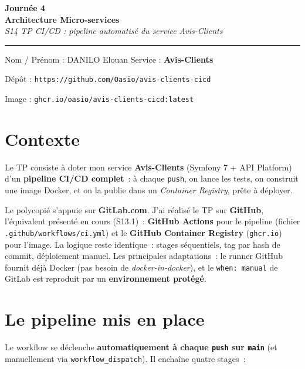 \documentclass[11pt,a4paper]{article}
\begin{document}
\thispagestyle{empty}
\begin{center}
  {\LARGE\bfseries Journée 4}\\[4pt]
  {\large\bfseries Architecture Micro-services}\\[6pt]
  {\normalsize\itshape S14 \textperiodcentered{} TP CI/CD : pipeline automatisé du service Avis-Clients}\\[6pt]
\end{center}

\vspace{4pt}\hrule\vspace{8pt}

Nom / Prénom : DANILO Elouan \hfill Service : \textbf{Avis-Clients}

\vspace{4pt}

Dépôt : \texttt{https://github.com/Oasio/avis-clients-cicd}

Image : \texttt{ghcr.io/oasio/avis-clients-cicd:latest}

\vspace{6pt}

\section{Contexte}

Le TP consiste à doter mon service \textbf{Avis-Clients} (Symfony 7 + API Platform) d'un
\textbf{pipeline CI/CD complet}~: à chaque \texttt{push}, on lance les tests, on construit une
image Docker, et on la publie dans un \emph{Container Registry}, prête à déployer.

Le polycopié s'appuie sur \textbf{GitLab.com}. J'ai réalisé le TP sur \textbf{GitHub}, l'équivalent
présenté en cours (S13.1)~: \textbf{GitHub Actions} pour le pipeline (fichier
\texttt{.github/workflows/ci.yml}) et le \textbf{GitHub Container Registry} (\texttt{ghcr.io}) pour
l'image. La logique reste identique~: stages séquentiels, tag par hash de commit, déploiement
manuel. Les principales adaptations~: le runner GitHub fournit déjà Docker (pas besoin de
\emph{docker-in-docker}), et le \texttt{when: manual} de GitLab est reproduit par un
\textbf{environnement protégé}.

\section{Le pipeline mis en place}

Le workflow se déclenche \textbf{automatiquement à chaque \texttt{push} sur \texttt{main}}
(et manuellement via \texttt{workflow\_dispatch}). Il enchaîne quatre stages~:
\end{document}
